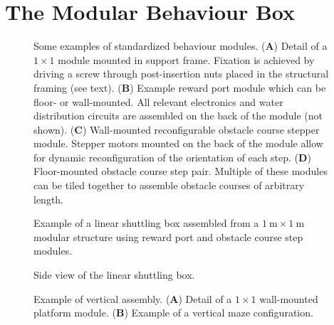 				
\section{The Modular Behaviour Box}

\begin{figure}
\centering

\caption{Some examples of standardized behaviour modules. (\textbf{A}) Detail of a $1\times 1$ module mounted in support frame. Fixation is achieved by driving a screw through post-insertion nuts placed in the structural framing (see text). (\textbf{B}) Example reward port module which can be floor- or wall-mounted. All relevant electronics and water distribution circuits are assembled on the back of the module (not shown). (\textbf{C}) Wall-mounted reconfigurable obstacle course stepper module. Stepper motors mounted on the back of the module allow for dynamic reconfiguration of the orientation of each step. (\textbf{D}) Floor-mounted obstacle course step pair. Multiple of these modules can be tiled together to assemble obstacle courses of arbitrary length.}
\label{fig:modules}
\end{figure}

\begin{figure}
\centering

\caption{Example of a linear shuttling box assembled from a $\SI{1}{\meter}\times \SI{1}{\meter}$ modular structure using reward port and obstacle course step modules.}
\label{fig:box}
\end{figure}

\begin{figure}
\centering

\caption{Side view of the linear shuttling box.}
\label{fig:box3d}
\end{figure}

\begin{figure}
\centering

\caption{Example of vertical assembly. (\textbf{A}) Detail of a $1\times 1$ wall-mounted platform module. (\textbf{B}) Example of a vertical maze configuration.}
\label{fig:verticalBox}
\end{figure}